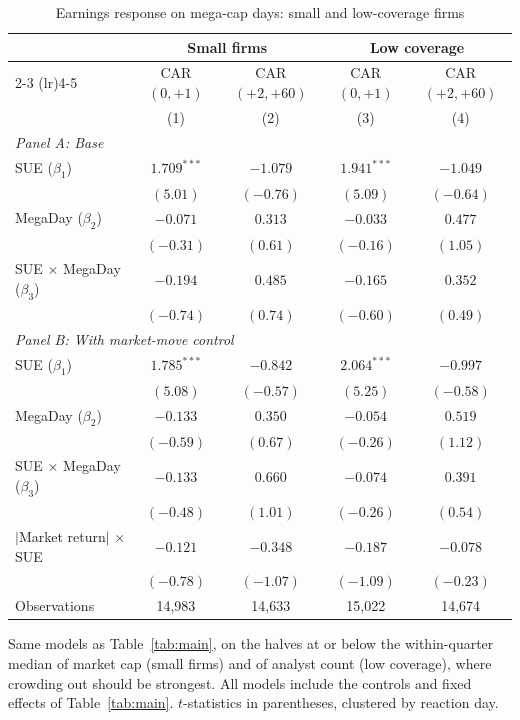 \begin{table}[htbp]
\centering
\small
\caption{Earnings response on mega-cap days: small and low-coverage firms}
\label{tab:main_halves}
\begin{tabular}{lcccc}
\toprule
 & \multicolumn{2}{c}{Small firms} & \multicolumn{2}{c}{Low coverage} \\
\cmidrule(lr){2-3} \cmidrule(lr){4-5}
 & CAR$(0,+1)$ & CAR$(+2,+60)$ & CAR$(0,+1)$ & CAR$(+2,+60)$ \\
 & (1) & (2) & (3) & (4) \\
\midrule
\multicolumn{5}{l}{\emph{Panel A: Base}} \\
SUE ($\beta_1$) & $1.709^{***}$ & $-1.079$ & $1.941^{***}$ & $-1.049$ \\
 & $(5.01)$ & $(-0.76)$ & $(5.09)$ & $(-0.64)$ \\[2pt]
MegaDay ($\beta_2$) & $-0.071$ & $0.313$ & $-0.033$ & $0.477$ \\
 & $(-0.31)$ & $(0.61)$ & $(-0.16)$ & $(1.05)$ \\[2pt]
SUE $\times$ MegaDay ($\beta_3$) & $-0.194$ & $0.485$ & $-0.165$ & $0.352$ \\
 & $(-0.74)$ & $(0.74)$ & $(-0.60)$ & $(0.49)$ \\[2pt]
\midrule
\multicolumn{5}{l}{\emph{Panel B: With market-move control}} \\
SUE ($\beta_1$) & $1.785^{***}$ & $-0.842$ & $2.064^{***}$ & $-0.997$ \\
 & $(5.08)$ & $(-0.57)$ & $(5.25)$ & $(-0.58)$ \\[2pt]
MegaDay ($\beta_2$) & $-0.133$ & $0.350$ & $-0.054$ & $0.519$ \\
 & $(-0.59)$ & $(0.67)$ & $(-0.26)$ & $(1.12)$ \\[2pt]
SUE $\times$ MegaDay ($\beta_3$) & $-0.133$ & $0.660$ & $-0.074$ & $0.391$ \\
 & $(-0.48)$ & $(1.01)$ & $(-0.26)$ & $(0.54)$ \\[2pt]
$|$Market return$|$ $\times$ SUE & $-0.121$ & $-0.348$ & $-0.187$ & $-0.078$ \\
 & $(-0.78)$ & $(-1.07)$ & $(-1.09)$ & $(-0.23)$ \\[2pt]
\midrule
Observations & 14,983 & 14,633 & 15,022 & 14,674 \\
\bottomrule
\end{tabular}
\par\medskip
\parbox{0.95\linewidth}{\footnotesize Same models as Table~\ref{tab:main}, on the halves at or below the within-quarter median of market cap (small firms) and of analyst count (low coverage), where crowding out should be strongest. All models include the controls and fixed effects of Table~\ref{tab:main}. $t$-statistics in parentheses, clustered by reaction day.}
\end{table}
